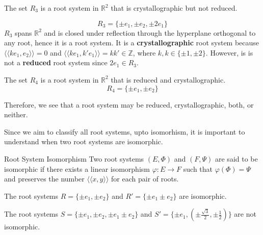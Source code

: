 \begin{example}
    The set $R_3$ is a root system in $\mathbb{R}^2$ that is crystallographic but not reduced.
    
    \begin{equation*}
        R_3 = \{
            \pm e_1, \pm e_2, \pm 2 e_1
        \} 
    \end{equation*}
    $R_3$ spans $\mathbb{R}^2$ and is closed under reflection through the hyperplane orthogonal to any root, hence it is a root system.
    It is a \textbf{crystallographic} root system because $\langle \langle k e_1, e_2 \rangle \rangle = 0$ and $\langle \langle k e_1, k' e_1 \rangle \rangle = kk' \in \mathbb{Z}$, where $k,k \in \{\pm 1, \pm 2\}$.
    However, is is not a \textbf{reduced} root system since $2 e_1 \in R_3$.
\end{example}


\begin{example}
    The set $R_4$ is a root system in $\mathbb{R}^2$ that is reduced and crystallographic.
    \begin{equation*}
        R_4 = \{
            \pm e_1, \pm e_2
            \} 
    \end{equation*}
\end{example}

Therefore, we see that a root system may be reduced, crystallographic, both, or neither. \newline

Since we aim to classify all root systems, upto isomorhism, it is important to understand when two root systems are isomorphic. \newline

\begin{nameddefinition}{Root System Isomorphism}
    Two root systems $(E, \Phi)$ and $(F,\Psi)$ are said to be isomorphic if there exists a linear isomorphism $\varphi: E \to F$ such that $\varphi(\Phi) = \Psi$
    and preserves the number $\langle \langle x, y \rangle \rangle$ for each pair of roots.
\end{nameddefinition}

\begin{example}
    The root systems $R = \{ \pm e_1, \pm e_2 \} $ and $R' = \{ \pm e_1 \pm e_2 \}$ are isomorphic.
\end{example}

\begin{example}
    The root systems $S = \{ \pm e_1, \pm e_2, \pm e_1 \pm e_2 \} $ and $S' = \{ \pm e_1, (\pm \frac{\sqrt{3}}{2}, \pm \frac{1}{2}) \}$ are not isomorphic.
\end{example}


